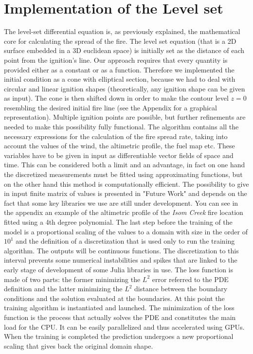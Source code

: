 \documentclass{juliacon}
\begin{document}
\section{Implementation of the Level set}
The level-set differential equation is, as previously explained, the mathematical core for calculating the spread of the fire. The level set equation (that is a 2D surface embedded in a 3D euclidean space) is initially set as the distance of each point from the ignition's line. Our approach requires that every quantity is provided either as a constant or as a function. Therefore we implemented the initial condition as a cone with elliptical section, because we had to deal with circular and linear ignition shapes (theoretically, any ignition shape can be given as input). The cone is then shifted down in order to make the contour level $z = 0$ resembling the desired initial fire line (see the Appendix for a graphical representation). Multiple ignition points are possible, but further refinements are needed to make this possibility fully functional.
The algorithm contains all the necessary expressions for the calculation of the fire spread rate, taking into account the values of the wind, the altimetric profile, the fuel map etc. These variables have to be given in input as differentiable vector fields of space and time.
This can be considered both a limit and an advantage, in fact on one hand the discretized measurements must be fitted using approximating functions, but on the other hand this method is computationally efficient. The possibility to give in input finite matrix of values is presented in "Future Work" and depends on the fact that some key libraries we use are still under development.
You can see in the appendix an example of the altimetric profile of the \textit{Isom Creek} fire location fitted using a 4th degree polynomial. 
The last step before the training of the model is a proportional scaling of the values to a domain with size in the order of $10^{1}$ and the definition of a discretization that is used only to run the training algorithm. The outputs will be continuous functions. The discretization to this interval prevents some numerical instabilities and spikes that are linked to the early stage of development of some Julia libraries in use. The loss function is made of two parts: the former minimizing the $L^2$ error referred to the PDE definition and the latter minimizing the $L^2$ distance between the boundary conditions and the solution evaluated at the boundaries. At this point the training algorithm is instantiated and launched. The minimization of the loss function is the process that actually solves the PDE and constitutes the main load for the CPU. It can be easily parallelized and thus accelerated using GPUs.
When the training is completed the prediction undergoes a new proportional scaling that gives back the original domain shape.
\end{document}
